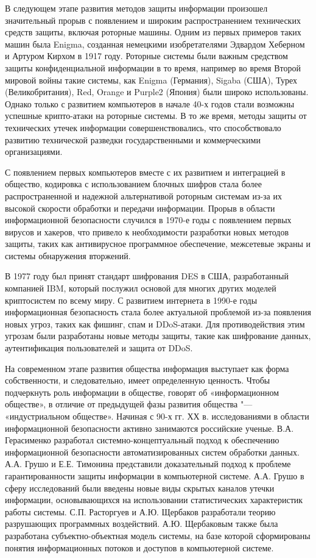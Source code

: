 В следующем этапе развития методов защиты информации произошел значительный прорыв с появлением и широким распространением 
технических средств защиты, включая роторные машины. Одним из первых примеров таких машин была Enigma, созданная немецкими 
изобретателями Эдвардом Хеберном и Артуром Кирхом в 1917 году. Роторные системы были важным средством защиты конфиденциальной 
информации в то время, например во время Второй мировой войны такие системы, как Enigma (Германия), Sigaba (США), Турех 
(Великобритания), Red, Orange и Purple2 (Япония) были широко использованы. Однако только с развитием компьютеров в начале 
40-х годов стали возможны успешные крипто-атаки на роторные системы. В то же время, методы защиты от технических утечек 
информации совершенствовались, что способствовало развитию технической разведки государственными и коммерческими 
организациями.

С появлением первых компьютеров вместе с их развитием и интеграцией в общество, кодировка с использованием блочных шифров стала более распространенной и надежной альтернативой роторным системам из-за их высокой скорости обработки и передачи 
информации. Прорыв в области информационной безопасности случился в 1970-е годы с появлением первых вирусов и хакеров, что 
привело к необходимости разработки новых методов защиты, таких как антивирусное программное обеспечение, межсетевые экраны и 
системы обнаружения вторжений.

В 1977 году был принят стандарт шифрования DES в США, разработанный компанией IBM, который послужил основой для многих других 
моделей криптосистем по всему миру. С развитием интернета в 1990-е годы информационная безопасность стала более актуальной 
проблемой из-за появления новых угроз, таких как фишинг, спам и DDoS-атаки. Для противодействия этим угрозам были разработаны 
новые методы защиты, такие как шифрование данных, аутентификация пользователей и защита от DDoS.\cite{sforum}

На современном этапе развития общества информация выступает как форма собственности, и следовательно, имеет определенную 
ценность. Чтобы подчеркнуть роль информации в обществе, говорят об «информационном обществе», в отличие от предыдущей фазы 
развития общества "---  «индустриальном обществе». Начиная с 90-х гг. ХХ в. исследованиями в области информационной безопасности 
активно занимаются российские ученые. В.А. Герасименко разработал системно-концептуальный подход к обеспечению информационной 
безопасности автоматизированных систем обработки данных. А.А. Грушо и Е.Е. Тимонина представили доказательный подход к 
проблеме гарантированности защиты информации в компьютерной системе. А.А. Грушо в сферу исследований были введены новые виды 
скрытых каналов утечки информации, основывающихся на использовании статистических характеристик работы системы. С.П. 
Расторгуев и А.Ю. Щербаков разработали теорию разрушающих программных воздействий. А.Ю. Щербаковым также была разработана 
субъектно-объектная модель системы, на базе которой сформированы понятия информационных потоков и доступов в компьютерной 
системе. 

